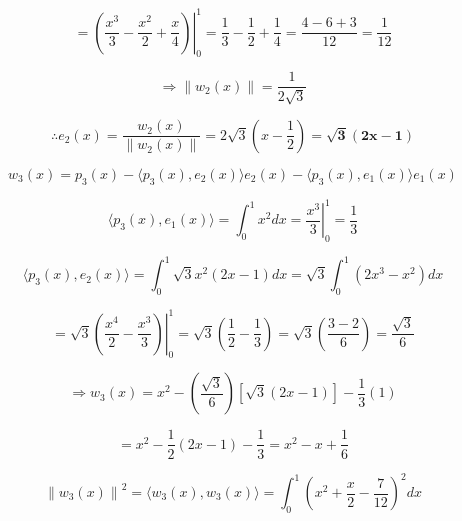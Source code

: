 \documentclass[fleqn]{article}
\newcommand{\norm}[1]{\left \lVert #1 \right \rVert}
\begin{document}
\begin{enumerate}[nolistsep]
		\begin{equation*}
			= \left.\left(\frac{x^3}{3} - \frac{x^2}{2} + \frac{x}{4}\right)\right\vert_{0}^{1} = \frac{1}{3} - \frac{1}{2} + \frac{1}{4} = \frac{4 - 6 + 3}{12} = \frac{1}{12}
		\end{equation*}
		
		\begin{equation*}
			\Rightarrow \norm{w_2(x)} = \frac{1}{2\sqrt{3}}
		\end{equation*}
			
		\begin{equation*}
			\therefore e_2(x) = \frac{w_2(x)}{\norm{w_2(x)}} = 2\sqrt{3}\left(x - \frac{1}{2}\right) = \mathbf{\sqrt{3}(2x - 1)}
		\end{equation*}
		
		\begin{equation*}
			w_3(x) = p_3(x) - \langle p_3(x), e_2(x) \rangle e_2(x) - \langle p_3(x), e_1(x) \rangle e_1(x)
		\end{equation*}
		
		\begin{equation*}
			\langle p_3(x), e_1(x) \rangle = \int_{0}^{1}{x^{2}dx} = \left.\frac{x^3}{3}\right\vert_{0}^{1} = \frac{1}{3}
		\end{equation*}
		
		\begin{equation*}
			\langle p_3(x), e_2(x) \rangle = \int_{0}^{1}{\sqrt{3}x^{2}(2x - 1)dx} = \sqrt{3}\int_{0}^{1}{(2x^{3} - x^2)dx}
		\end{equation*}
		
		\begin{equation*}
		 	= \sqrt{3}\left.\left(\frac{x^{4}}{2} - \frac{x^{3}}{3}\right)\right\vert_{0}^{1} = \sqrt{3}\left(\frac{1}{2} - \frac{1}{3}\right) = \sqrt{3}\left(\frac{3 - 2}{6}\right) = \frac{\sqrt{3}}{6}
		\end{equation*}
		
		\begin{equation*}
			\Rightarrow w_3(x) = x^2  - \left(\frac{\sqrt{3}}{6}\right)[\sqrt{3}(2x - 1)] - \frac{1}{3}(1)
		\end{equation*}
		
		\begin{equation*}
			 = x^2 - \frac{1}{2}(2x - 1) - \frac{1}{3} = x^2 - x + \frac{1}{6}
		\end{equation*}
		
		\begin{equation*}
			\norm{w_3(x)}^2 = \langle w_3(x), w_3(x) \rangle = \int_{0}^{1}{\left(x^2 + \frac{x}{2} - \frac{7}{12}\right)^{2}dx}
		\end{equation*}
		

\end{enumerate}
\end{document}
